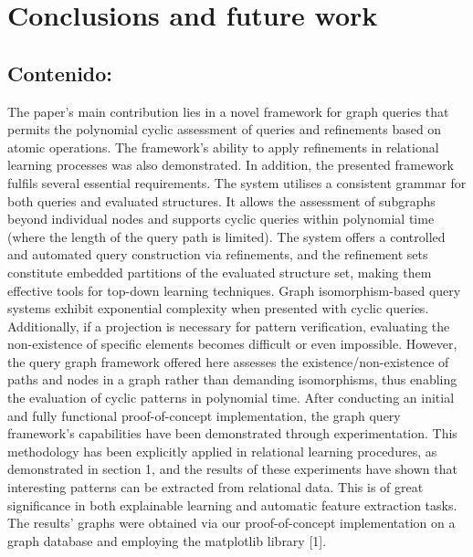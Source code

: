 \documentclass{article}%
\begin{document}
%
\clearpage%
\section{Conclusions and future work}%
\label{sec:Conclusionsandfuturework}%
\subsection{Contenido:}%
\label{subsec:Contenido}%
The paper's main contribution lies in a novel framework for graph queries that permits the polynomial cyclic assessment of queries and refinements based on atomic operations. The framework's ability to apply refinements in relational learning processes was also demonstrated. In addition, the presented framework fulfils several essential requirements. The system utilises a consistent grammar for both queries and evaluated structures. It allows the assessment of subgraphs beyond individual nodes and supports cyclic queries within polynomial time (where the length of the query path is limited). The system offers a controlled and automated query construction via refinements, and the refinement sets constitute embedded partitions of the evaluated structure set, making them effective tools for top{-}down learning techniques.\newline%
\newline%
Graph isomorphism{-}based query systems exhibit exponential complexity when presented with cyclic queries. Additionally, if a projection is necessary for pattern verification, evaluating the non{-}existence of specific elements becomes difficult or even impossible. However, the query graph framework offered here assesses the existence/non{-}existence of paths and nodes in a graph rather than demanding isomorphisms, thus enabling the evaluation of cyclic patterns in polynomial time.\newline%
\newline%
After conducting an initial and fully functional proof{-}of{-}concept implementation, the graph query framework's capabilities have been demonstrated through experimentation. This methodology has been explicitly applied in relational learning procedures, as demonstrated in section 1, and the results of these experiments have shown that interesting patterns can be extracted from relational data. This is of great significance in both explainable learning and automatic feature extraction tasks. The results' graphs were obtained via our proof{-}of{-}concept implementation on a graph database and employing the matplotlib library {[}1{]}.\newline%
\end{document}
